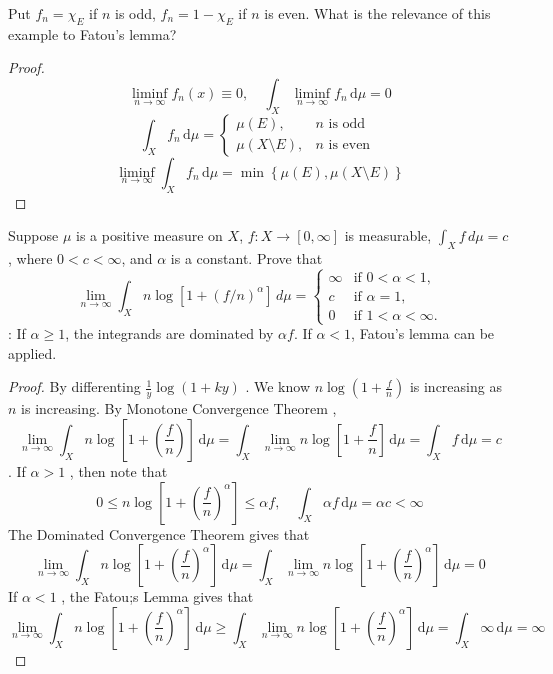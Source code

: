 \documentclass[../main.tex]{subfiles}
\begin{document}
\begin{problem}{}{}
Put $f_n = \chi_E$ if $n$ is odd, $f_n = 1 - \chi_E$ if $n$ is even. What is the relevance of this example to Fatou's lemma?
\end{problem}

\begin{proof}
     \[
     \liminf_{n\to \infty} f_{n}\left( x \right)\equiv 0 ,\quad  \int_{X}\liminf_{n\to \infty}f_{n}\,\mathrm{d} \mu = 0
     \] \[
     \int_{X}f_{n}\,\mathrm{d} \mu = \begin{cases} \mu \left( E \right),& n \text{ is odd }\\ 
      \mu \left( X\setminus E \right),& n \text{ is even }    \end{cases} 
     \] \[
     \liminf_{n\to \infty} \int_{X}f_{n}\,\mathrm{d} \mu =  \min \left\{ \mu \left( E \right),\mu \left( X\setminus E \right)   \right\}
     \]
\end{proof}
\begin{problem}{}{}
Suppose $\mu$ is a positive measure on $X$, $f: X \to [0, \infty]$ is measurable, $\int_X f \,d\mu = c$, where $0 < c < \infty$, and $\alpha$ is a constant. Prove that
\[ \lim_{n \to \infty} \int_X n \log [1 + (f/n)^\alpha] \,d\mu = 
\begin{cases}
\infty & \text{if } 0 < \alpha < 1, \\
c & \text{if } \alpha = 1, \\
0 & \text{if } 1 < \alpha < \infty.
\end{cases}
\]
: If $\alpha \ge 1$, the integrands are dominated by $\alpha f$. If $\alpha < 1$, Fatou's lemma can be applied.
\end{problem}
\begin{proof}
    By differenting  \( \frac{1 }{y }  \log\left( 1+ ky \right)   \) .  We know \(  n\log\left( 1+ \frac{f }{n }  \right)   \) is increasing as \(  n  \) is increasing.  By Monotone Convergence Theorem , \[
    \lim_{n\to \infty} \int_{X} n\log\left[ 1+ \left( \frac{f }{n }  \right)  \right]\,\mathrm{d} \mu =  \int_{X} \lim_{n\to \infty} n\log\left[ 1+ \frac{f }{n }  \right]\,\mathrm{d} \mu = \int_{X} f\,\mathrm{d} \mu = c
    \]. 
    If \(  \alpha > 1  \) , then note that \[
    0\le n\log\left[ 1+ \left( \frac{f }{n }  \right)^{\alpha }  \right] \le   \alpha f,\quad  \int_{X} \alpha f\,\mathrm{d} \mu = \alpha c< \infty
    \]  The Dominated Convergence Theorem gives that \[
    \lim_{n\to \infty} \int_{X} n\log\left[ 1+ \left( \frac{f }{n }  \right)^{\alpha }  \right]\,\mathrm{d} \mu =  \int_{X}\lim_{n\to \infty} n\log\left[ 1+ \left( \frac{f }{n }  \right)^{\alpha }   \right]\,\mathrm{d} \mu = 0  
    \] If \(  \alpha < 1  \) , the Fatou;s Lemma gives that \[
    \lim_{n\to \infty} \int_{X} n\log\left[ 1+ \left( \frac{f }{n }  \right)^{\alpha }  \right]\,\mathrm{d} \mu \ge  \int_{X} \lim_{n\to \infty} n\log\left[ 1+ \left( \frac{f }{n }  \right)^{\alpha }  \right]\,\mathrm{d} \mu =  \int_{X} \infty\,\mathrm{d} \mu = \infty  
    \]
\end{proof}
\end{document}
